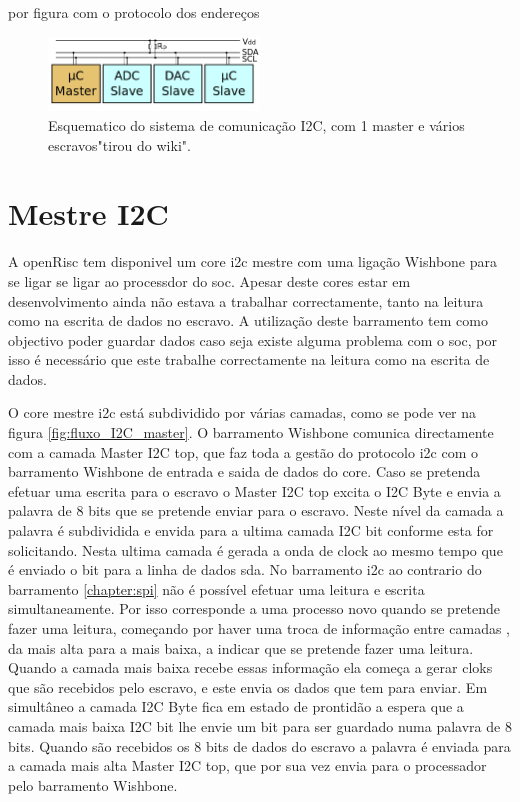 por figura com o protocolo dos endereços


\begin{figure}[!htb]
  \centering
  \includegraphics[width=0.50\textwidth]{Figures/I2C.png}
  \caption[Protocolo I2C]{Esquematico do sistema de comunicação I2C, com 1 master e vários escravos"tirou do wiki".}
  \label{fig:ligacoesI2C}
\end{figure}


\section{Mestre I2C}

A openRisc tem disponivel um core \acrshort{i2c} mestre com uma ligação Wishbone para se ligar se ligar ao processdor do \acrshort{soc}. Apesar deste cores estar em desenvolvimento ainda  não estava a trabalhar correctamente, tanto na leitura como na escrita de dados no escravo. A utilização deste barramento tem como objectivo poder guardar dados caso seja existe alguma problema com o \acrshort{soc}, por isso é necessário que este trabalhe correctamente na leitura como na escrita de dados.

O core mestre \acrshort{i2c} está subdividido por várias camadas, como se pode ver na figura \ref{fig:fluxo_I2C_master}. O barramento Wishbone comunica directamente com a camada Master I2C top, que faz toda a gestão do protocolo \acrshort{i2c} com o barramento Wishbone de entrada e saida de dados do core. Caso se pretenda efetuar uma escrita para o escravo o Master I2C top excita o I2C Byte e envia a palavra de 8 bits que se pretende enviar para o escravo. Neste nível da camada a palavra é subdividida e envida para a ultima camada I2C bit conforme esta for solicitando. Nesta ultima camada é gerada a onda de clock ao mesmo tempo que é enviado o bit para a linha de dados \acrlong{sda}. No barramento \acrshort{i2c} ao contrario do barramento \ref{chapter:spi} não é possível efetuar uma leitura e escrita simultaneamente. Por isso corresponde a uma processo novo quando se pretende fazer uma leitura, começando por haver uma troca de informação entre camadas , da mais alta para a mais baixa, a indicar que se pretende fazer uma leitura. Quando a camada mais baixa recebe essas informação ela começa a gerar cloks que são recebidos pelo escravo, e este envia os dados que tem para enviar. Em simultâneo a camada I2C Byte fica em estado de prontidão a espera que a camada mais baixa I2C bit lhe envie um bit para ser guardado numa palavra de 8 bits. Quando são recebidos os 8 bits de dados do escravo a palavra é enviada para a camada mais alta Master I2C top, que por sua vez envia para o processador pelo barramento Wishbone.

